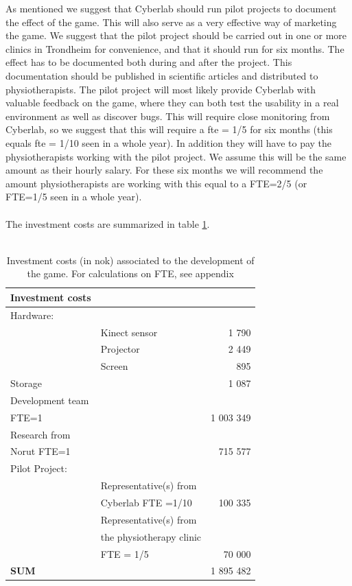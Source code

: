 As mentioned we suggest that Cyberlab should run pilot projects to document the effect of the game. This will also serve as a very effective way of marketing the game. We suggest that the pilot project should be carried out in one or more clinics in Trondheim for convenience, and that it should run for six months. The effect has to be documented both during and after the project. This documentation should be published in scientific articles and distributed to physiotherapists. The pilot project will most likely provide Cyberlab with valuable feedback on the game, where they can both test the usability in a real environment as well as discover bugs. This will require close monitoring from Cyberlab, so we suggest that this will require a \ac{fte} = 1/5 for  six months (this equals \ac{fte} = 1/10 seen in a whole year). In addition they will have to pay the physiotherapists working with the pilot project. We assume this will be the same amount as their hourly salary. For these six months we will recommend the amount physiotherapists are working with this equal to a FTE=2/5 (or FTE=1/5 seen in a whole year).\\ \\
The investment costs are summarized in table \ref{tab:investmentcosts}.\\ \\
\begin{table}
\centering
    \begin{tabular}{|l|l|r|}
        \hline
       \textbf{Investment costs}  & &\\ \hline
       Hardware: & & \\ \hline
	   & Kinect sensor & 1 790  \\ \hline
	   & Projector & 2 449 \\ \hline
	   & Screen & 895 \\ \hline
	   Storage & & 1 087 \\ \hline
	   Development team & & \\  
	   FTE=1 &  & 1 003 349   \\ \hline
	   Research from & & \\ 
	   Norut FTE=1 & & 715 577 \\ \hline
	   Pilot Project: & & \\ \hline
	   & Representative(s) from & \\
	   & Cyberlab FTE =1/10 & 100 335  \\ \hline
	   & Representative(s) from & \\
	   & the physiotherapy clinic & \\
	   & FTE = 1/5 & 70 000  \\ \hline
	   \textbf{SUM} & & 1 895 482 
 \\ \hline
    \end{tabular}
    \caption[Investment costs associated to the development of the game]{Investment costs (in \ac{nok}) associated to the development of the game. For calculations on FTE, see appendix}
    \label{tab:investmentcosts}
\end{table}
